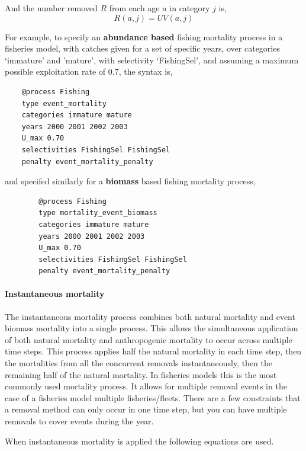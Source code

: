 And the number removed $R$ from each age $a$ in category $j$ is,
\begin{equation}
  R(a,j) = UV(a,j)
\end{equation}

For example, to specify an \textbf{abundance based} fishing mortality process in a fisheries model, with catches given for a set of specific years, over categories `immature' and 'mature', with selectivity `FishingSel', and assuming a maximum possible exploitation rate of 0.7, the syntax is,

{\small{\begin{verbatim}
	@process Fishing
	type event_mortality
	categories immature mature
	years 2000 2001 2002 2003
	U_max 0.70
	selectivities FishingSel FishingSel
	penalty event_mortality_penalty
	\end{verbatim}}}

and specifed similarly for a \textbf{biomass} based fishing mortality process,

{\small{\begin{verbatim}
		@process Fishing
		type mortality_event_biomass
		categories immature mature
		years 2000 2001 2002 2003
		U_max 0.70
		selectivities FishingSel FishingSel
		penalty event_mortality_penalty
		\end{verbatim}}}

\paragraph{Instantaneous mortality}\label{subsubsec:instantaneous-mortality}

The instantaneous mortality process combines both natural mortality and event biomass mortality into a single process. This allows the simultaneous application of both natural mortality and anthropogenic mortality to occur across multiple time steps. This process applies half the natural mortality in each time step, then the mortalities from all the concurrent removals instantaneously, then the remaining half of the natural mortality. In fisheries models this is the most commonly used mortality process. It allows for multiple removal events in the case of a fisheries model multiple fisheries/fleets. There are a few constraints that a removal method can only occur in one time step, but you can have multiple removals to cover events during the year.

When instantaneous mortality is applied the following equations are used.


